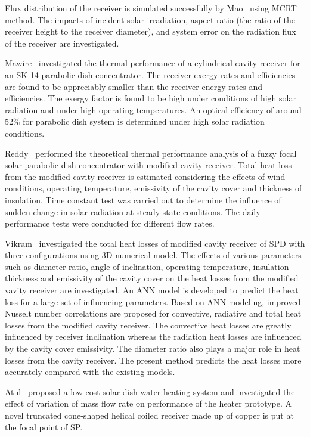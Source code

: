 Flux distribution of the receiver is simulated successfully by Mao~\cite{Mao2014b} using MCRT method. The impacts of incident solar irradiation, aspect ratio (the ratio of the receiver height to the receiver diameter), and system error on the radiation flux of the receiver are investigated.

Mawire~\cite{Mawire2014} investigated the thermal performance of a cylindrical cavity receiver for an SK-14 parabolic dish concentrator. The receiver exergy rates and efficiencies are found to be appreciably smaller than the receiver energy rates and efficiencies. The exergy factor is found to be high under conditions of high solar radiation and under high operating temperatures. An optical efficiency of around 52\% for parabolic dish system is determined under high solar radiation conditions.

Reddy~\cite{Reddy2015,Reddy2015_2} performed the theoretical thermal performance analysis of a fuzzy focal solar parabolic dish concentrator with modified cavity receiver. Total heat loss from the modified cavity receiver is estimated considering the effects of wind conditions, operating temperature, emissivity of the cavity cover and thickness of insulation. Time constant test was carried out to determine the influence of sudden change in solar radiation at steady state conditions. The daily performance tests were conducted for different flow rates.

Vikram~\cite{Vikram2015} investigated the total heat losses of modified cavity receiver of SPD with three configurations using 3D numerical model. The effects of various parameters such as diameter ratio, angle of inclination, operating temperature, insulation thickness and emissivity of the cavity cover on the heat losses from the modified vavity receiver are investigated. An ANN model is developed to predict the heat loss for a large set of influencing parameters. Based on ANN modeling, improved Nusselt number correlations are proposed for convective, radiative and total heat losses from the modified cavity receiver. The convective heat losses are greatly influenced by receiver inclination whereas the radiation heat losses are influenced by the cavity cover emissivity. The diameter ratio also plays a major role in heat losses from the cavity receiver. The present method predicts the heat losses more accurately compared with the existing models.

Atul~\cite{Atul2015} proposed a low-cost solar dish water heating system and investigated the effect of variation of mass flow rate on performance of the heater prototype. A novel truncated cone-shaped helical coiled receiver made up of copper is put at the focal point of SP.

